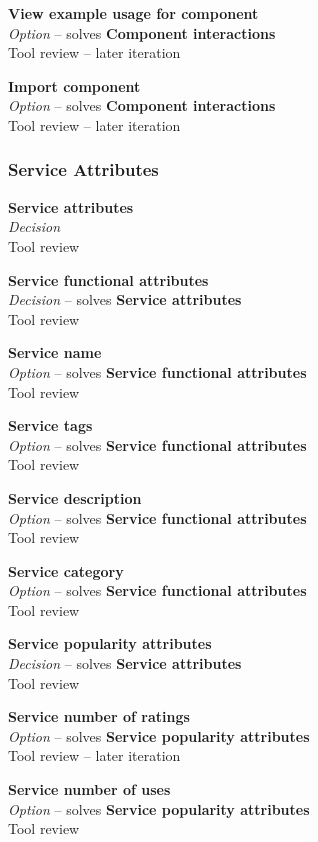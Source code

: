 \textbf{View example usage for component} \\ \emph{Option} -- solves \textbf{Component interactions} \\ Tool review  -- later iteration

\textbf{Import component} \\ \emph{Option} -- solves \textbf{Component interactions} \\ Tool review  -- later iteration

\subsubsection{Service Attributes}

\textbf{Service attributes} \\ \emph{Decision} \\ Tool review

\textbf{Service functional attributes} \\ \emph{Decision} -- solves \textbf{Service attributes} \\ Tool review

\textbf{Service name} \\ \emph{Option} -- solves \textbf{Service functional attributes} \\ Tool review

\textbf{Service tags} \\ \emph{Option} -- solves \textbf{Service functional attributes} \\ Tool review

\textbf{Service description} \\ \emph{Option} -- solves \textbf{Service functional attributes} \\ Tool review

\textbf{Service category} \\ \emph{Option} -- solves \textbf{Service functional attributes} \\ Tool review

\textbf{Service popularity attributes} \\ \emph{Decision} -- solves \textbf{Service attributes} \\ Tool review

\textbf{Service number of ratings} \\ \emph{Option} -- solves \textbf{Service popularity attributes} \\ Tool review  -- later iteration

\textbf{Service number of uses} \\ \emph{Option} -- solves \textbf{Service popularity attributes} \\ Tool review

